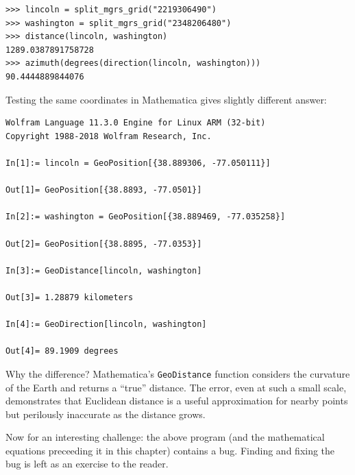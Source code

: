\documentclass{book}
\begin{document}
\begin{lstlisting}
>>> lincoln = split_mgrs_grid("2219306490")
>>> washington = split_mgrs_grid("2348206480")
>>> distance(lincoln, washington)
1289.0387891758728
>>> azimuth(degrees(direction(lincoln, washington)))
90.4444889844076
\end{lstlisting}

Testing the same coordinates in Mathematica gives slightly different answer:

\begin{lstlisting}
Wolfram Language 11.3.0 Engine for Linux ARM (32-bit)
Copyright 1988-2018 Wolfram Research, Inc.

In[1]:= lincoln = GeoPosition[{38.889306, -77.050111}]

Out[1]= GeoPosition[{38.8893, -77.0501}]

In[2]:= washington = GeoPosition[{38.889469, -77.035258}]

Out[2]= GeoPosition[{38.8895, -77.0353}]

In[3]:= GeoDistance[lincoln, washington]

Out[3]= 1.28879 kilometers

In[4]:= GeoDirection[lincoln, washington]

Out[4]= 89.1909 degrees
\end{lstlisting}

Why the difference? Mathematica's \texttt{GeoDistance} function considers the curvature of the Earth and returns a ``true'' distance. The error, even at such a small scale, demonstrates that Euclidean distance is a useful approximation for nearby points but perilously inaccurate as the distance grows.

Now for an interesting challenge: the above program (and the mathematical equations preceeding it in this chapter) contains a bug. Finding and fixing the bug is left as an exercise to the reader.



\end{document}
